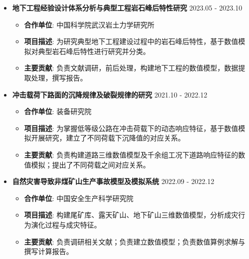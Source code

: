 \documentclass[a4paper,12pt]{extarticle}
\begin{document}
\begin{itemize}
 \item\textbf{地下工程经验设计体系分析与典型工程岩石峰后特性研究} \hfill 2023.05 - 2023.10 %
         \begin{itemize}
            \item \textbf{合作单位}: 中国科学院武汉岩土力学研究所 %
            \item \textbf{项目描述}: 为研究典型地下工程建设过程中的岩石峰后特性，基于数值模拟对典型岩石峰后特性进行研究并分类。 %
            \item \textbf{主要贡献}: 负责文献调研，前后处理，构建地下工程的数值模型，数据提取处理，撰写报告。 %
\end{itemize}
\end{itemize}


\begin{itemize}
 \item\textbf{冲击载荷下路面的沉降规律及破裂规律的研究} \hfill 2021.10 - 2022.12 %
         \begin{itemize}
            \item \textbf{合作单位}: 装备研究院 %
            \item \textbf{项目描述}: 为掌握低等级公路在冲击荷载下的动态响应特征，基于数值模拟开展研究，建立了不同荷载下沉降值的对应关系。 %
            \item \textbf{主要贡献}: 负责构建道路三维数值模型及千余组工况下道路响应特征的数值模拟；提出了不同荷载之间对应关系。 %
\end{itemize}
\end{itemize}

\begin{itemize}
 \item\textbf{自然灾害导致非煤矿山生产事故模型及模拟系统} \hfill2022.09 - 2022.12 %
         \begin{itemize}
            \item \textbf{合作单位}: 中国安全生产科学研究院 %
            \item \textbf{项目描述}: 构建尾矿库、露天矿山、地下矿山三维数值模型，分析成灾行为演化过程与成灾特征。 %
            \item \textbf{主要贡献}: 负责调研相关文献；负责建立数值模型；负责数值算例求解与撰写计算报告。%
\end{itemize}
\end{itemize}






\end{document}
